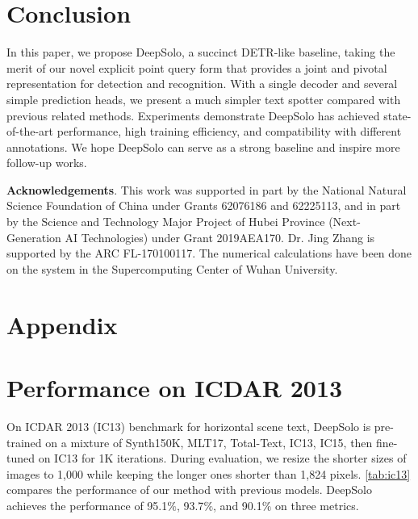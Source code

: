 \documentclass[10pt,twocolumn,letterpaper]{article}
\begin{document}
\section{Conclusion}
In this paper, we propose DeepSolo, a succinct DETR-like baseline, taking the merit of our novel explicit point query form that provides a joint and pivotal representation for detection and recognition. With a single decoder and several simple prediction heads, we present a much simpler text spotter compared with previous related methods. Experiments demonstrate DeepSolo has achieved state-of-the-art performance, high training efficiency, and compatibility with different annotations. We hope DeepSolo can serve as a strong baseline and inspire more follow-up works.

\noindent \textbf{Acknowledgements}. This work was supported in part by the National Natural Science Foundation of China under Grants 62076186 and 62225113, and in part by the Science and Technology Major Project of Hubei Province (Next-Generation AI Technologies) under Grant 2019AEA170. Dr. Jing Zhang is supported by the ARC FL-170100117. The numerical calculations have been done on the system in the Supercomputing Center of Wuhan University.


\appendix
{\centering\section*{Appendix}}
\section{Performance on ICDAR 2013}
On ICDAR 2013 (IC13) benchmark for horizontal scene text, DeepSolo is pre-trained on a mixture of Synth150K, MLT17, Total-Text, IC13, IC15, then fine-tuned on IC13 for 1K iterations. During evaluation, we resize the shorter sizes of images to 1,000 while keeping the longer ones shorter than 1,824 pixels. \cref{tab:ic13} compares the performance of our method with previous models. DeepSolo achieves the performance of 95.1$\%$, 93.7$\%$, and 90.1$\%$ on three metrics.
\end{document}
